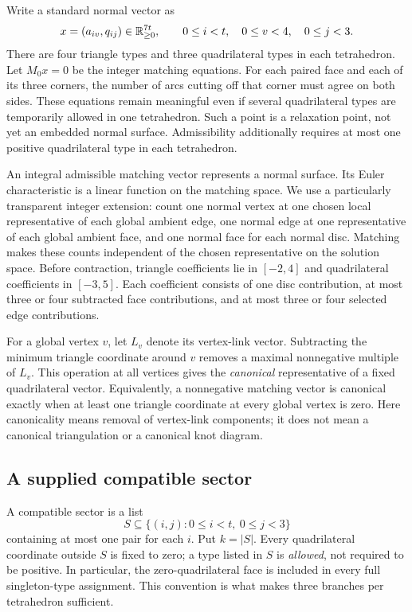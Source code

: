 Write a standard normal vector as
\[
 x=(a_{iv},q_{ij})\in\mathbb R_{\ge0}^{7t},\qquad
 0\le i<t,\quad 0\le v<4,\quad 0\le j<3.
\]
There are four triangle types and three quadrilateral types in each tetrahedron. Let $M_0x=0$ be the integer matching equations. For each paired face and each of its three corners, the number of arcs cutting off that corner must agree on both sides. These equations remain meaningful even if several quadrilateral types are temporarily allowed in one tetrahedron. Such a point is a relaxation point, not yet an embedded normal surface. Admissibility additionally requires at most one positive quadrilateral type in each tetrahedron.

An integral admissible matching vector represents a normal surface. Its Euler characteristic is a linear function on the matching space. We use a particularly transparent integer extension: count one normal vertex at one chosen local representative of each global ambient edge, one normal edge at one representative of each global ambient face, and one normal face for each normal disc. Matching makes these counts independent of the chosen representative on the solution space. Before contraction, triangle coefficients lie in $[-2,4]$ and quadrilateral coefficients in $[-3,5]$. Each coefficient consists of one disc contribution, at most three or four subtracted face contributions, and at most three or four selected edge contributions.

For a global vertex $v$, let $L_v$ denote its vertex-link vector. Subtracting the minimum triangle coordinate around $v$ removes a maximal nonnegative multiple of $L_v$. This operation at all vertices gives the \emph{canonical} representative of a fixed quadrilateral vector. Equivalently, a nonnegative matching vector is canonical exactly when at least one triangle coordinate at every global vertex is zero. Here canonicality means removal of vertex-link components; it does not mean a canonical triangulation or a canonical knot diagram.

\subsection{A supplied compatible sector}

A compatible sector is a list
\[
 S\subseteq\{(i,j):0\le i<t,\ 0\le j<3\}
\]
containing at most one pair for each $i$. Put $k=|S|$. Every quadrilateral coordinate outside $S$ is fixed to zero; a type listed in $S$ is \emph{allowed}, not required to be positive. In particular, the zero-quadrilateral face is included in every full singleton-type assignment. This convention is what makes three branches per tetrahedron sufficient.

